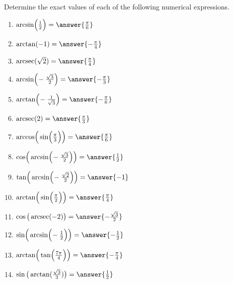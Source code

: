 \documentclass{ximera}
\author{Elizabeth Campolongo}
\begin{document}
\begin{exercise}

Determine the exact values of each of the following numerical expressions.  %
%
\begin{enumerate}
\item $\arcsin\!\Big(\frac{1}{2}\Big) = \answer{\frac{\pi}{6}}$
%
\item $\arctan(-1) = \answer{-\frac{\pi}{4}}$
%
\item $\arcsec(\sqrt{2}) = \answer{\frac{\pi}{4}}$
%
\item $\arcsin\!\Big(\!-\frac{\sqrt{3}}{2}\Big) = \answer{-\frac{\pi}{3}}$
%
\item $\arctan\!\Big(\!-\frac{1}{\sqrt{3}}\Big) = \answer{-\frac{\pi}{6}}$
%
\item $\arcsec(2) = \answer{\frac{\pi}{3}}$
%
\item $\arccos\!\Big(\sin\!\Big(\frac{\pi}{3}\Big)\Big) = \answer{\frac{\pi}{6}}$
%
\item $\cos\!\Big(\arcsin\!\Big(\!-\frac{\sqrt{3}}{2}\Big)\Big) = \answer{\frac{1}{2}}$
%
\item $\tan\!\Big(\arcsin\!\Big(\!-\frac{\sqrt{2}}{2}\Big)\Big) = \answer{-1}$
%
\item $\arctan\!\Big(\sin\!\Big(\frac{\pi}{2}\Big)\Big) = \answer{\frac{\pi}{4}}$
%
\item $\cos\big(\arcsec(-2)\big) = \answer{-\frac{\sqrt{3}}{2}}$
%
\item $\sin\!\Big(\arcsin\!\Big(\!-\frac{1}{2}\Big)\Big) = \answer{-\frac{1}{2}}$
%
\item $\arctan\!\Big(\tan\!\Big(\frac{7\pi}{4}\Big)\Big) = \answer{-\frac{\pi}{4}}$
%
\item $\sin\big(\arctan(\frac{\sqrt{3}}{3})\big) = \answer{\frac{1}{2}}$
%
\end{enumerate}
\end{exercise}
\end{document}
